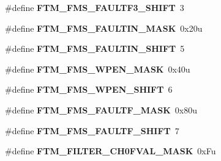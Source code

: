 \begin{DoxyCompactItemize}
\item 
\#define {\bfseries F\+T\+M\+\_\+\+F\+M\+S\+\_\+\+F\+A\+U\+L\+T\+F3\+\_\+\+S\+H\+I\+FT}~3\hypertarget{group__FTM__Register__Masks_ga382e6be42b0f3b858d7b84eca9874ec0}{}\label{group__FTM__Register__Masks_ga382e6be42b0f3b858d7b84eca9874ec0}

\item 
\#define {\bfseries F\+T\+M\+\_\+\+F\+M\+S\+\_\+\+F\+A\+U\+L\+T\+I\+N\+\_\+\+M\+A\+SK}~0x20u\hypertarget{group__FTM__Register__Masks_ga8dc6b10cac09f19a505e0e1f6348e2ff}{}\label{group__FTM__Register__Masks_ga8dc6b10cac09f19a505e0e1f6348e2ff}

\item 
\#define {\bfseries F\+T\+M\+\_\+\+F\+M\+S\+\_\+\+F\+A\+U\+L\+T\+I\+N\+\_\+\+S\+H\+I\+FT}~5\hypertarget{group__FTM__Register__Masks_ga7a46a22f36d059f68a8ac08aca8df377}{}\label{group__FTM__Register__Masks_ga7a46a22f36d059f68a8ac08aca8df377}

\item 
\#define {\bfseries F\+T\+M\+\_\+\+F\+M\+S\+\_\+\+W\+P\+E\+N\+\_\+\+M\+A\+SK}~0x40u\hypertarget{group__FTM__Register__Masks_gada77d4d54efd09f61e02636d5e234f94}{}\label{group__FTM__Register__Masks_gada77d4d54efd09f61e02636d5e234f94}

\item 
\#define {\bfseries F\+T\+M\+\_\+\+F\+M\+S\+\_\+\+W\+P\+E\+N\+\_\+\+S\+H\+I\+FT}~6\hypertarget{group__FTM__Register__Masks_gad0b6b97c900f82f6127d5acd85b8f965}{}\label{group__FTM__Register__Masks_gad0b6b97c900f82f6127d5acd85b8f965}

\item 
\#define {\bfseries F\+T\+M\+\_\+\+F\+M\+S\+\_\+\+F\+A\+U\+L\+T\+F\+\_\+\+M\+A\+SK}~0x80u\hypertarget{group__FTM__Register__Masks_ga93fbf9b3017167d24d1f0c067bccb539}{}\label{group__FTM__Register__Masks_ga93fbf9b3017167d24d1f0c067bccb539}

\item 
\#define {\bfseries F\+T\+M\+\_\+\+F\+M\+S\+\_\+\+F\+A\+U\+L\+T\+F\+\_\+\+S\+H\+I\+FT}~7\hypertarget{group__FTM__Register__Masks_ga05ba4258421f814e99f498159df781d7}{}\label{group__FTM__Register__Masks_ga05ba4258421f814e99f498159df781d7}

\item 
\#define {\bfseries F\+T\+M\+\_\+\+F\+I\+L\+T\+E\+R\+\_\+\+C\+H0\+F\+V\+A\+L\+\_\+\+M\+A\+SK}~0x\+Fu\hypertarget{group__FTM__Register__Masks_ga021b2ed3cc7b79cda874ff49fbd0dd5a}{}\label{group__FTM__Register__Masks_ga021b2ed3cc7b79cda874ff49fbd0dd5a}


\end{DoxyCompactItemize}
